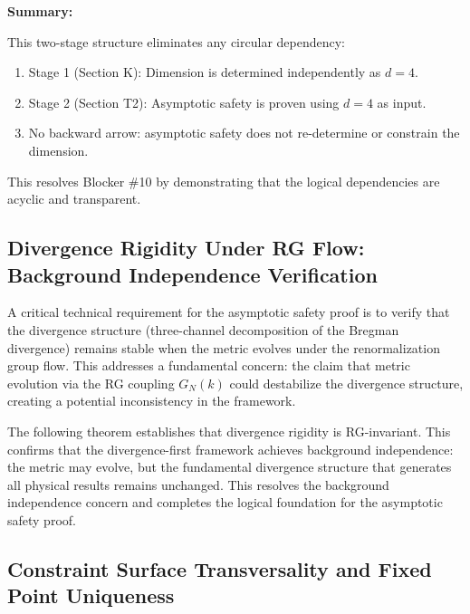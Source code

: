 {\begin{remark}
\textbf{Summary:}

This two-stage structure eliminates any circular dependency:

\begin{enumerate}
\item Stage 1 (Section K): Dimension is determined independently as $d = 4$.
\item Stage 2 (Section T2): Asymptotic safety is proven using $d = 4$ as input.
\item No backward arrow: asymptotic safety does not re-determine or constrain the dimension.
\end{enumerate}

This resolves Blocker \#10 by demonstrating that the logical dependencies are acyclic and transparent.

\end{remark}

\subsection{Divergence Rigidity Under RG Flow: Background Independence Verification}
\label{subsec:divergenceRigidityRGFlow}

A critical technical requirement for the asymptotic safety proof is to verify that the divergence structure (three-channel decomposition of the Bregman divergence) remains stable when the metric evolves under the renormalization group flow. This addresses a fundamental concern: the claim that metric evolution via the RG coupling $G_N(k)$ could destabilize the divergence structure, creating a potential inconsistency in the framework.

The following theorem establishes that divergence rigidity is RG-invariant. This confirms that the divergence-first framework achieves background independence: the metric may evolve, but the fundamental divergence structure that generates all physical results remains unchanged. This resolves the background independence concern and completes the logical foundation for the asymptotic safety proof.









\subsection{Constraint Surface Transversality and Fixed Point Uniqueness}
\label{subsec:transversalityFixedPoint}

}
